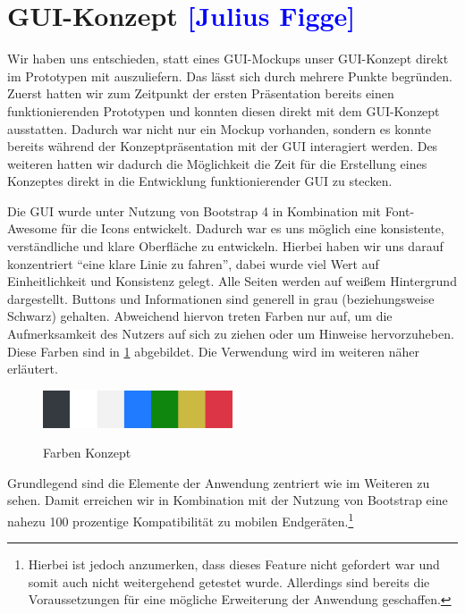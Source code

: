 

\section{GUI-Konzept \textcolor{blue}{[Julius Figge]}}

Wir haben uns entschieden, statt eines GUI-Mockups unser GUI-Konzept direkt im Prototypen mit auszuliefern.
Das lässt sich durch mehrere Punkte begründen.
Zuerst hatten wir zum Zeitpunkt der ersten Präsentation bereits einen funktionierenden Prototypen und konnten diesen direkt mit dem GUI-Konzept ausstatten. Dadurch war nicht nur ein Mockup vorhanden, sondern es konnte bereits während der Konzeptpräsentation mit der GUI interagiert werden.
Des weiteren hatten wir dadurch die Möglichkeit die Zeit für die Erstellung eines Konzeptes direkt in die Entwicklung funktionierender GUI zu stecken.

Die GUI wurde unter Nutzung von Bootstrap 4 in Kombination mit Font-Awesome für die Icons entwickelt.
Dadurch war es uns möglich eine konsistente, verständliche und klare Oberfläche zu entwickeln.
Hierbei haben wir uns darauf konzentriert \enquote{eine klare Linie zu fahren}, dabei wurde viel Wert auf Einheitlichkeit und Konsistenz gelegt. Alle Seiten werden auf weißem Hintergrund dargestellt. Buttons und Informationen sind generell in grau (beziehungsweise Schwarz) gehalten.
Abweichend hiervon treten Farben nur auf, um die Aufmerksamkeit des Nutzers auf sich zu ziehen oder um Hinweise hervorzuheben. Diese Farben sind in \cref{fig:farbmuster} abgebildet. Die Verwendung wird im weiteren näher erläutert.

\begin{figure}[h!!]
    \centering
    \begin{minipage}[t]{1\textwidth}
        \caption{Farben Konzept}
        \includegraphics[width=0.5\textwidth]{img/Farbmuster.png}\\
        \label{fig:farbmuster}
    \end{minipage}
\end{figure}


Grundlegend sind die Elemente der Anwendung zentriert wie im Weiteren zu sehen. Damit erreichen wir in Kombination mit der Nutzung von Bootstrap eine nahezu 100 prozentige Kompatibilität zu mobilen Endgeräten.\footnote{Hierbei ist jedoch anzumerken, dass dieses Feature nicht gefordert war und somit auch nicht weitergehend getestet wurde. Allerdings sind bereits die Voraussetzungen für eine mögliche Erweiterung der Anwendung geschaffen.}

